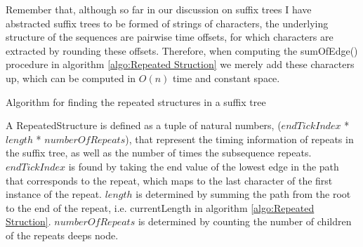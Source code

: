 \documentclass[12pt,twoside,notitlepage]{report}
\begin{document}
			Remember that, although so far in our discussion on suffix trees I have abstracted suffix trees to be formed of strings of characters, the underlying structure of the sequences are pairwise time offsets, for which characters are extracted by rounding these offsets. Therefore, when computing the sumOfEdge() procedure in algorithm \ref{algo:Repeated Struction} we merely add these characters up, which can be computed in $O(n)$ time and constant space.
			
			\begin{algorithm}
			\caption{Algorithm for finding the repeated structures in a suffix tree}
			\label{algo:Repeated Struction}
			\begin{algorithmic}[1]
				
					
					\Else
						\Else
						\EndIf
					\EndIf
				\EndFor
			\EndProcedure
				\State {}
			\EndProcedure
			\end{algorithmic}
		\end{algorithm}
		
		A RepeatedStructure is defined as a tuple of natural numbers, ($endTickIndex$ * $length$ * $numberOfRepeats$), that represent the timing information of repeats in the suffix tree, as well as the number of times the subsequence repeats. $endTickIndex$ is found by taking the end value of the lowest edge in the path that corresponds to the repeat, which maps to the last character of the first instance of the repeat. $length$ is determined by summing the path from the root to the end of the repeat, i.e. currentLength in algorithm \ref{algo:Repeated Struction}. $numberOfRepeats$ is determined by counting the number of children of the repeats deeps node.
		
\end{document}
